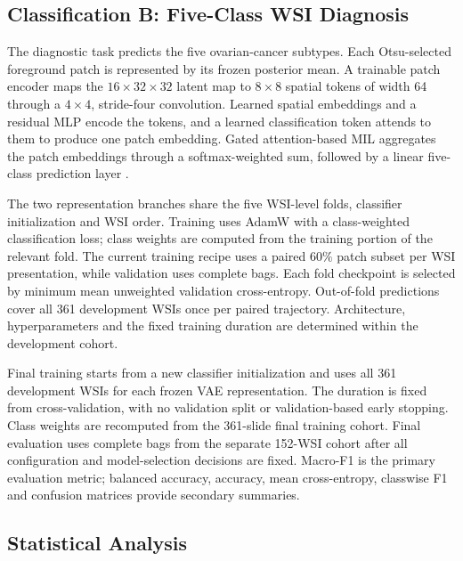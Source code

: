 \documentclass{midl}
\begin{document}
\subsection{Classification B: Five-Class WSI Diagnosis}

The diagnostic task predicts the five ovarian-cancer subtypes. Each Otsu-selected foreground patch is represented by its frozen posterior mean. A trainable patch encoder maps the $16\times32\times32$ latent map to $8\times8$ spatial tokens of width 64 through a $4\times4$, stride-four convolution. Learned spatial embeddings and a residual MLP encode the tokens, and a learned classification token attends to them to produce one patch embedding. Gated attention-based MIL aggregates the patch embeddings through a softmax-weighted sum, followed by a linear five-class prediction layer \cite{ilse_attention_2018}.

The two representation branches share the five WSI-level folds, classifier initialization and WSI order. Training uses AdamW with a class-weighted classification loss; class weights are computed from the training portion of the relevant fold. The current training recipe uses a paired $60\%$ patch subset per WSI presentation, while validation uses complete bags. Each fold checkpoint is selected by minimum mean unweighted validation cross-entropy. Out-of-fold predictions cover all 361 development WSIs once per paired trajectory. Architecture, hyperparameters and the fixed training duration are determined within the development cohort.

Final training starts from a new classifier initialization and uses all 361 development WSIs for each frozen VAE representation. The duration is fixed from cross-validation, with no validation split or validation-based early stopping. Class weights are recomputed from the 361-slide final training cohort. Final evaluation uses complete bags from the separate 152-WSI cohort after all configuration and model-selection decisions are fixed. Macro-F1 is the primary evaluation metric; balanced accuracy, accuracy, mean cross-entropy, classwise F1 and confusion matrices provide secondary summaries.

\subsection{Statistical Analysis}
\end{document}
